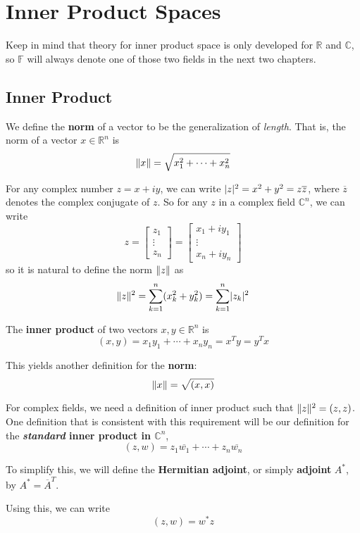 
\chapter{Inner Product Spaces}

Keep in mind that theory for inner product space is only developed for $\mathbb{R}$ and $\mathbb{C}$, so $\mathbb{F}$ will always denote one of those two fields in the next two chapters. 

\section{Inner Product}

\begin{definition}
We define the \textbf{norm} of a vector to be the generalization of \textit{length}. That is, the norm of a vector $x \in \mathbb{R}^{n}$ is 
$$\lVert x\rVert = \sqrt{x_{1}^{2} + \cdots + x_{n}^{2}}$$

For any complex number $z = x + iy$, we can write $\lvert z\rvert^{2} = x^{2} + y^{2} = z \overline{z}$, where $\overline{z}$ denotes the complex conjugate of $z$. So for any $z$ in a complex field $\mathbb{C}^{n}$, we can write 
$$z = \begin{bmatrix}
z_{1} \\
\vdots \\
z_{n}
\end{bmatrix} = \begin{bmatrix}
x_{1} + iy_{1} \\
\vdots \\
x_{n} + iy_{n}
\end{bmatrix}$$
so it is natural to define the norm $\lVert z\rVert$ as 
$$\lVert z\rVert^{2} = \sum_{k = 1}^{n} (x_{k}^{2} + y_{k}^{2}) = \sum_{k=1}^{n} \lvert z_{k}\rvert^{2}$$
\end{definition}

\begin{definition}
The \textbf{inner product} of two vectors $x, y \in \mathbb{R}^{n}$ is
$$(x, y) = x_{1} y_{1} + \cdots + x_{n} y_{n} = x^{T} y = y^{T} x$$

This yields another definition for the \textbf{norm}: 
$$\lVert x\rVert = \sqrt{(x, x)}$$

For complex fields, we need a definition of inner product such that $\lVert z\rVert^{2} = (z, z)$. One definition that is consistent with this requirement will be our definition for the \textbf{\textit{standard} inner product in $\mathbb{C}^{n}$}, 
$$(z, w) = z_{1} \overline{w_{1}} + \cdots + z_{n} \overline{w_{n}}$$

To simplify this, we will define the \textbf{Hermitian adjoint}, or simply \textbf{adjoint} $A^{*}$, by $A^{*} = \overline{A}^{T}$. 

Using this, we can write 
$$(z, w) = w^{*} z$$ 
\end{definition}

